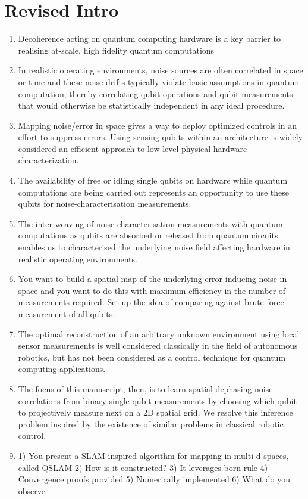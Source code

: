 \section{Revised Intro}
\begin{enumerate}
	\item Decoherence acting on quantum computing hardware is a key barrier to realising at-scale, high fidelity quantum computations 
	\item In realistic operating environments, noise sources are often correlated in space or time and these noise drifts typically violate basic assumptions in quantum computation;  thereby correlating qubit operations and qubit measurements that would otherwise be statistically independent in any ideal procedure. 
	\item  Mapping noise/error in space gives a way to deploy optimized controls in an effort to suppress errors.  Using sensing qubits within an architecture is widely considered an efficient approach to low level physical-hardware characterization.
	\item The availability of free or idling single qubits on hardware while quantum computations are being carried out represents an opportunity to use these qubits for noise-characterisation measurements.
	\item The inter-weaving of noise-characterisation measurements with quantum computations as qubits are absorbed or released from quantum circuits enables us to characterised the underlying noise field affecting hardware in realistic operating environments.
	\item You want to build a spatial map of the underlying error-inducing noise in space and you want to do this with maximum efficiency in the number of measurements required.  Set up the idea of comparing against brute force measurement of all qubits.
	\item The optimal reconstruction of an arbitrary unknown environment using local sensor measurements is well considered classically in the field of autonomous robotics, but has not been considered as a control technique for quantum computing applications.
	\item  The focus of this manuscript, then, is to learn spatial dephasing noise correlations from binary single qubit measurements by choosing which qubit to projectively measure next on a 2D spatial grid. We resolve this inference problem inspired by the existence of similar problems in classical robotic control.
	\item 1) You present a SLAM inspired algorithm for mapping in multi-d spaces, called QSLAM
	2) How is it constructed?
	3) It leverages born rule
	4) Convergence proofs provided
	5) Numerically implemented
	6) What do you observe
\end{enumerate}

